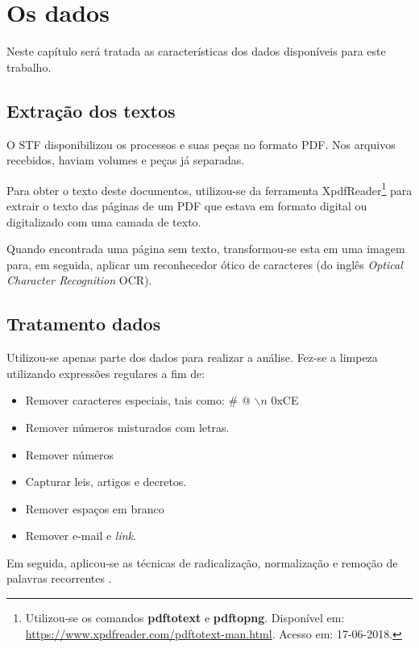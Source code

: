 \chapter[Os dados]{Os dados}

Neste capítulo será tratada as características dos dados disponíveis para este trabalho.

\section{Extração dos textos}

O STF disponibilizou os processos e suas peças no formato PDF. Nos arquivos recebidos, haviam volumes e peças já separadas.

Para obter o texto deste documentos, utilizou-se da ferramenta XpdfReader\footnote{Utilizou-se os comandos \textbf{pdftotext} e \textbf{pdftopng}. Disponível em: \url{https://www.xpdfreader.com/pdftotext-man.html}. Acesso em: 17-06-2018.} para extrair o texto das páginas de um PDF que estava em formato digital ou digitalizado com uma camada de texto.

Quando encontrada uma página sem texto, transformou-se esta em uma imagem para, em seguida, aplicar um reconhecedor ótico de caracteres (do inglês \textit{Optical Character Recognition} OCR).

\section{Tratamento dados}

Utilizou-se apenas parte dos dados para realizar a análise. Fez-se a limpeza utilizando expressões regulares \cite{GOYUAERTS2012} a fim de:

\begin{itemize}
	\item Remover caracteres especiais, tais como: \# @ $\backslash n$ 0xCE
    \item Remover números misturados com letras.
    \item Remover números
    \item Capturar leis, artigos e decretos.
    \item Remover espaços em branco
    \item Remover e-mail e \textit{link}.
\end{itemize}

Em seguida, aplicou-se as técnicas de radicalização, normalização \cite{SINGH2016} e remoção de palavras recorrentes \cite{MANNING2008}.


